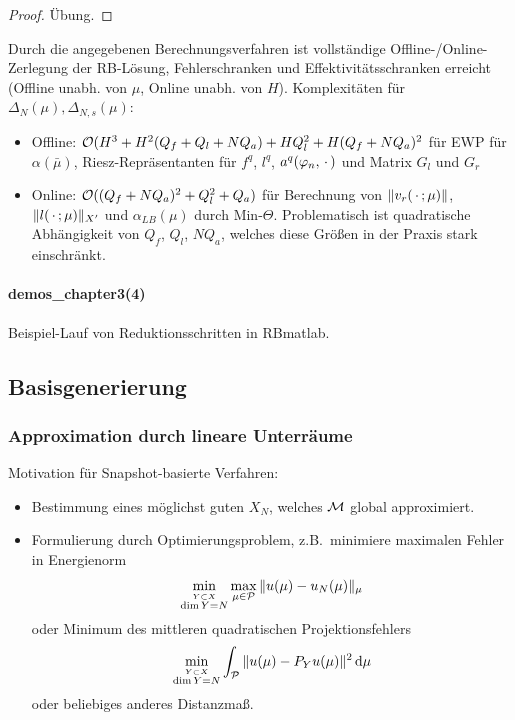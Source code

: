 \begin{proof}
	Übung.
\end{proof}

\begin{bem}[Komplexitäten]
	Durch die angegebenen Berechnungsverfahren ist vollständige Offline-/Online-Zerlegung der RB-Lösung, Fehlerschranken und Effektivitätsschranken erreicht (Offline unabh. von $\mu$, Online unabh. von $H$). Komplexitäten für $\Delta_N(\mu), \Delta_{N,s}(\mu)$:
	\begin{itemize}
		\item Offline: $\mathcal O(H^3 + H^2 (Q_f + Q_l + N Q_a) + H Q_l^2 + H(Q_f + NQ_a)^2$ für EWP für $\alpha(\bar{\mu})$,
			Riesz-Repräsentanten für $f^q$, $l^q$, $a^q(\varphi_n,\,\cdot\,)$ und Matrix $G_l$ und $G_r$
		\item Online: $\mathcal O((Q_f+N Q_a)^2 + Q_l^2 + Q_a)$ für Berechnung von $\|v_r(\,\cdot\,;\mu)\|$, $\|l(\,\cdot\,;\mu)\|_{X'}$ und $\alpha_{LB}(\mu)$ durch Min-$\Theta$.
			Problematisch ist quadratische Abhängigkeit von $Q_f$, $Q_l$, $N Q_a$, welches diese Größen in der Praxis stark einschränkt.
	\end{itemize}
\end{bem}

\paragraph{demos\_chapter3(4)} Beispiel-Lauf von Reduktionsschritten in RBmatlab.

\subsection{Basisgenerierung}
\label{sec-3.4}

\subsubsection*{Approximation durch lineare Unterräume}

Motivation für Snapshot-basierte Verfahren:
\begin{itemize}
	\item Bestimmung eines möglichst guten $X_N$, welches $\mathcal{M}$ global approximiert.
	\item Formulierung durch Optimierungsproblem, z.B.\ minimiere maximalen Fehler in Energienorm
		\begin{equation}
			\min_{\stackrel{Y \subset X}{\dim Y = N}} \max_{\mu \in \mathcal{P}} \|u(\mu)-u_N(\mu)\|_\mu
		\end{equation}
		oder Minimum des mittleren quadratischen Projektionsfehlers
		\begin{equation}
			\min_{\stackrel{Y \subset X}{\dim Y = N}} \int_{\mathcal{P}} \|u(\mu)-P_Y u(\mu)\|^2 \,\mathrm{d}\mu
		\end{equation}
		oder beliebiges anderes Distanzmaß.
\end{itemize}

